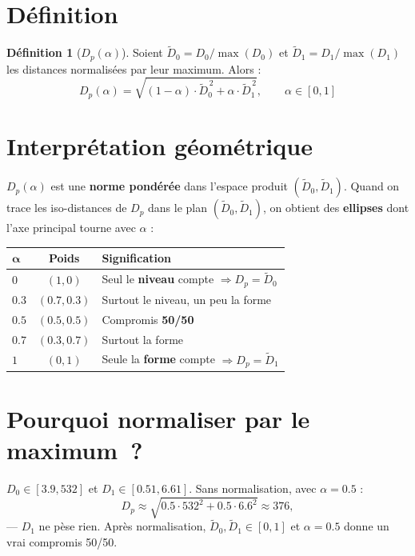 \documentclass[11pt, a4paper]{article}
\newcommand{\Dp}{D_p}
\theoremstyle{definition}
\newtheorem{definition}{Définition}[section]
\theoremstyle{remark}
\begin{document}
\section{Définition}

\begin{definition}[$\Dp(\alpha)$]
Soient $\tilde{D}_0 = D_0 / \max(D_0)$ et $\tilde{D}_1 = D_1 / \max(D_1)$
les distances normalisées par leur maximum. Alors :
\[
  \boxed{
    \Dp(\alpha) = \sqrt{(1 - \alpha) \cdot \tilde{D}_0^{\,2}
    + \alpha \cdot \tilde{D}_1^{\,2}},
    \qquad \alpha \in [0, 1]
  }
\]
\end{definition}

\section{Interprétation géométrique}

$\Dp(\alpha)$ est une \textbf{norme pondérée} dans l'espace produit
$(\tilde{D}_0, \tilde{D}_1)$. Quand on trace les iso-distances de $\Dp$ dans
le plan $(\tilde{D}_0, \tilde{D}_1)$, on obtient des \textbf{ellipses} dont l'axe
principal tourne avec $\alpha$ :

\begin{center}
\begin{tabular}{lcl}
  \toprule
  $\boldsymbol{\alpha}$ & \textbf{Poids} & \textbf{Signification} \\
  \midrule
  $0$ & $(1, 0)$ & Seul le \textbf{niveau} compte $\Rightarrow \Dp = \tilde{D}_0$ \\
  $0.3$ & $(0.7, 0.3)$ & Surtout le niveau, un peu la forme \\
  $0.5$ & $(0.5, 0.5)$ & Compromis \textbf{50/50} \\
  $0.7$ & $(0.3, 0.7)$ & Surtout la forme \\
  $1$ & $(0, 1)$ & Seule la \textbf{forme} compte $\Rightarrow \Dp = \tilde{D}_1$ \\
  \bottomrule
\end{tabular}
\end{center}

\section{Pourquoi normaliser par le maximum~?}

$D_0 \in [3.9, 532]$ et $D_1 \in [0.51, 6.61]$. Sans normalisation, avec
$\alpha = 0.5$ :
\[
  \Dp \approx \sqrt{0.5 \cdot 532^2 + 0.5 \cdot 6.6^2} \approx 376,
\]
— $D_1$ ne pèse rien. Après normalisation, $\tilde{D}_0, \tilde{D}_1 \in [0,1]$
et $\alpha = 0.5$ donne un vrai compromis 50/50.
\end{document}
